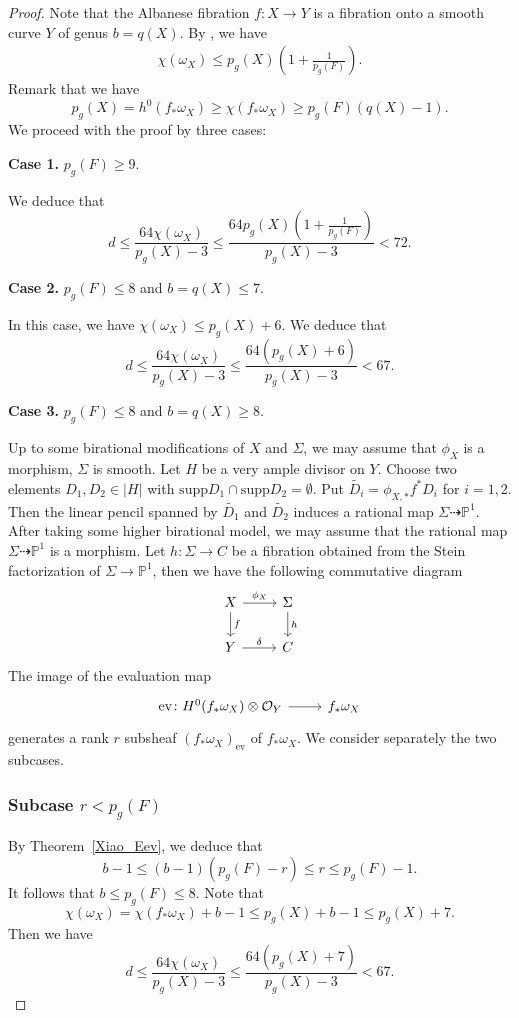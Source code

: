 \documentclass[11pt]{amsart}
\theoremstyle{plain}
\theoremstyle{definition}
\numberwithin{equation}{section}
\newcommand{\ev}{\mathrm{ev}}
\newcommand{\supp}{\mathrm{supp}}
\newcommand{\PP}{\mathbb{P}}
\newcommand{\sO}{\mathcal{O}}
\begin{document}
\begin{proof}
Note that the Albanese fibration $f: X\to Y$ is a fibration onto a smooth curve $Y$ of genus $b=q(X)$. By \cite[Proposition 2.1]{CH06}, we have
\begin{align}\label{ineq:pg}
\chi(\omega_X)\leq p_g(X)(1+\frac{1}{p_g(F)}).
\end{align}
Remark that we have $$
p_g(X)=h^0(f_{\ast}\omega_X)\geq \chi(f_{\ast}\omega_X)\geq p_g(F)(q(X)-1).
$$
We proceed with the proof by three cases:

{\bf Case 1.}  $p_g(F)\geq 9$. 

We deduce that
\[
d\leq \frac{64\chi(\omega_X)}{p_g(X)-3}\leq \frac{64p_g(X)(1+\frac{1}{p_g(F)})}{p_g(X)-3}< 72.
\]

{\bf Case 2.} $p_g(F)\leq 8$ and $b=q(X)\leq 7$.

In this case, we have $\chi(\omega_X)\leq p_g(X)+6$. We deduce that
$$
d\leq \frac{64\chi(\omega_X)}{p_g(X)-3}\leq \frac{64(p_g(X)+6)}{p_g(X)-3}<67.
$$

{\bf Case 3.}  $p_g(F)\leq 8$ and $b=q(X)\geq 8$. 

Up to  some birational modifications of $X$ and $\Sigma$, we may assume that $\phi_X$ is a morphism, $\Sigma$ is smooth. Let $H$ be a very ample divisor on $Y$. Choose two elements $D_1,D_2\in |H|$ with $\supp D_1\cap\supp D_2=\emptyset$. Put $\widetilde{D_i}=\phi_{X,\ast}f^{\ast}D_i$ for $i=1,2$. Then the linear pencil spanned by $\widetilde{D_1}$ and $\widetilde{D_2}$ induces a rational map $\Sigma\dashrightarrow \PP^1$. After taking some higher birational model, we may assume that the rational map $\Sigma\dashrightarrow \PP^1$ is  a morphism. Let $h\colon \Sigma\to C$ be a fibration obtained from the Stein factorization of $\Sigma\to \PP^1$, then we have the following commutative diagram
\[
\begin{tikzcd}
 X \arrow[r, "\phi_X"]\arrow[d, "f"] & \Sigma \arrow[d,"h"]\\
Y \arrow[r,"\delta"] & C
\end{tikzcd}
\]
The image of the evaluation map
\[
\begin{tikzcd}
 \ev\colon H^0(f_{\ast}\omega_X)\otimes\sO_Y \arrow[r] & f_{\ast}\omega_X
\end{tikzcd}
\]
generates a rank $r$ subsheaf $(f_{\ast}\omega_X)_{\ev}$ of $f_{\ast}\omega_X$. We consider separately the two subcases.
\subsubsection*{Subcase $r<p_g(F)$} 
 By Theorem~\ref{Xiao_Eev}, we deduce that 
 $$
 b-1\leq(b-1)(p_g(F)-r)\leq r\leq p_g(F)-1.
 $$
 It follows that $b\leq p_g(F)\leq 8$. Note that 
 $$
\chi(\omega_X)=\chi(f_{\ast}\omega_X)+b-1\leq p_g(X)+b-1\leq p_g(X)+7.
$$
Then we have
\[
d\leq \frac{64\chi(\omega_X)}{p_g(X)-3}\leq \frac{64(p_g(X)+7)}{p_g(X)-3}< 67.
\]

\end{proof}
\end{document}
